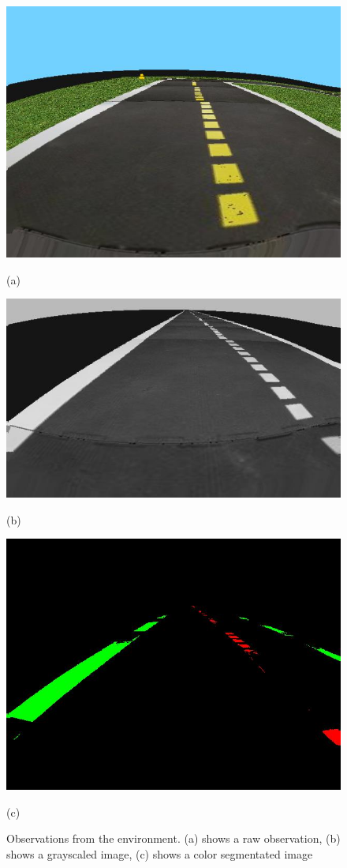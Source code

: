 \documentclass{article}
\begin{document}
\begin{figure}[H]
	\centering
	\begin{minipage}{.3\textwidth}
	\centering
	\includegraphics[width=0.8\linewidth]{rawobs.jpg}
	\caption{(a)}
	\end{minipage}%
	\begin{minipage}{.3\textwidth}
	\centering
	\includegraphics[width=0.8\linewidth]{grayscale.jpg}
	\caption{(b)}
	\end{minipage}%
\begin{minipage}{.3\textwidth}
	\centering
	\includegraphics[width=0.8\linewidth]{colorseg.jpg}
	\caption{(c)}
\end{minipage}
\caption{Observations from the environment. (a) shows a raw observation, (b) shows a grayscaled image, (c) shows a color segmentated image}
\end{figure}
\end{document}

